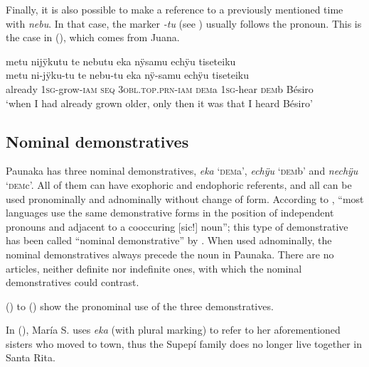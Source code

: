 Finally, it is also possible to make a reference to a previously mentioned time with \textit{nebu}. In that case, the  marker \textit{-tu} (see ) usually follows the pronoun. This is the case in (), which comes from Juana.

\ea\label{ex:nebu-3}
\begingl
\glpreamble metu nijÿkutu te nebutu eka nÿsamu echÿu tiseteiku\\
\gla metu ni-jÿku-tu te nebu-tu eka nÿ-samu echÿu tiseteiku\\
\glb already 1\textsc{sg}-grow-\textsc{iam} \textsc{seq} 3\textsc{obl.top.prn}-\textsc{iam} \textsc{dem}a 1\textsc{sg}-hear \textsc{dem}b Bésiro\\
\glft ‘when I had already grown older, only then it was that I heard Bésiro’
\endgl
\trailingcitation{[jxx-p120430l-1.033]}
\xe



\subsection{Nominal demonstratives}\label{sec:DemPron}


Paunaka has three nominal demonstratives, \textit{eka} ‘\textsc{dem}a’, \textit{echÿu} ‘\textsc{dem}b’ and \textit{nechÿu} ‘\textsc{dem}c’. All of them can have exophoric and endophoric referents, and all can be used pronominally and adnominally without change of form. According to \citet[60]{Diessel1999}, “most languages use the same demonstrative forms in the position of independent pronouns and adjacent to a cooccuring [sic!] noun”; this type of demonstrative has been called “nominal demonstrative” by \citet[65]{Dixon2003}. When used adnominally, the nominal demonstratives always precede the noun in Paunaka. There are no articles, neither definite nor indefinite ones, with which the nominal demonstratives could contrast.

() to () show the pronominal use of the three demonstratives.

In (), María S. uses \textit{eka} (with plural marking) to refer to her aforementioned sisters who moved to town, thus the Supepí family does no longer live together in Santa Rita.

